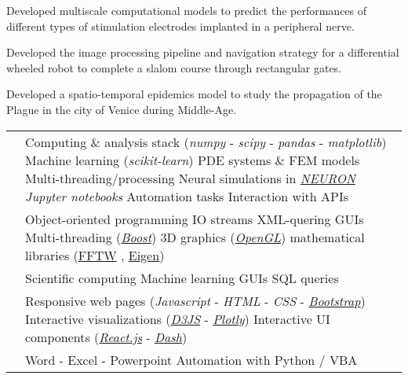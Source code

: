 \documentclass[a4paper]{cv}
\begin{document}
\begin{minipage}[t]{0.6\textwidth}
\projects

Developed multiscale computational models to predict the performances of different types of stimulation electrodes implanted in a peripheral nerve.
\sectionspace

Developed the image processing pipeline and navigation strategy for a differential wheeled robot to complete a slalom course through rectangular gates.
\sectionspace

Developed a spatio-temporal epidemics model to study the propagation of the Plague in the city of Venice during Middle-Age.
\sectionspace

\techskills

\def\arraystretch{1.5}
\begin{tabular}{R{0.21\textwidth} L{0.7\textwidth}}

 & Computing \& analysis stack (\emph{numpy} - \emph{scipy} - \emph{pandas} - \emph{matplotlib}) \tbl{} Machine learning (\emph{scikit-learn}) \tbl{} PDE systems \& FEM models \tbl{} Multi-threading/processing \tbl{} Neural simulations in \href{https://neuron.yale.edu/neuron/}{\emph{NEURON}} \tbl{} \emph{Jupyter notebooks} \tbl{} Automation tasks \tbl{}Interaction with APIs\\

 & Object-oriented programming \tbl{} IO streams \tbl{} XML-quering \tbl{} GUIs \tbl{} Multi-threading (\href{https://www.boost.org/}{\emph{Boost}}) \tbl{} 3D graphics (\href{https://www.opengl.org/}{\emph{OpenGL}}) \tbl{} mathematical libraries (\href{http://fftw.org/}{FFTW} , \href{http://eigen.tuxfamily.org/index.php?title=Main_Page}{Eigen})\\

 & Scientific computing \tbl{} Machine learning \tbl{} GUIs \tbl{} SQL queries\\

 & Responsive web pages (\emph{Javascript} - \emph{HTML} - \emph{CSS} - \href{http://getbootstrap.com/}{\emph{Bootstrap}}) \tbl{} Interactive visualizations (\href{https://d3js.org}{\emph{D3JS}} - \href{https://plot.ly/}{\emph{Plotly}}) \tbl{} Interactive UI components (\href{https://reactjs.org}{\emph{React.js}} - \href{https://dash.plot.ly/}{\emph{Dash}}) \\

 & Word - Excel - Powerpoint \tbl{} Automation with Python / VBA\\

\end{tabular}

\vspace{5pt}
\otherskills

\end{minipage}
\end{document}
